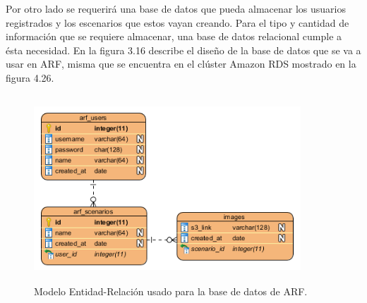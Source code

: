 \par
Por otro lado se requerirá una base de datos que pueda almacenar los usuarios registrados y los escenarios que estos vayan creando. Para el tipo y cantidad de información que se requiere almacenar, una base de datos relacional cumple a ésta necesidad. En la figura  3.16 describe el diseño de la base de datos que se va a usar en ARF, misma que se encuentra en el clúster Amazon RDS mostrado en la figura 4.26.
\begin{figure}[H]
	\centering
	\includegraphics[width=10cm,height=7cm]{imagenes/desarrollo/arquitectura/ERD.png}
	\caption{Modelo Entidad-Relación usado para la base de datos de ARF.}
	\label{fig:arqbackend}
\end{figure}